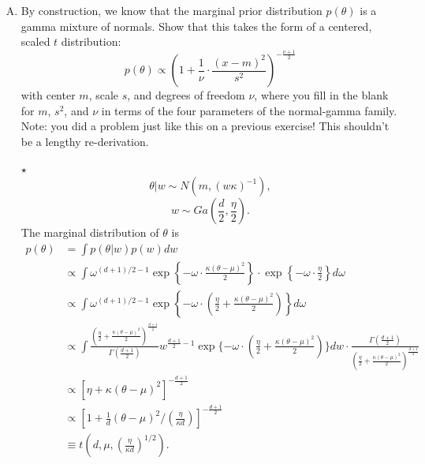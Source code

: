 \documentclass[11pt]{article}
\newcommand{\jie}{$\star$ }
\begin{document}
\begin{enumerate}[(A)]


\item By construction, we know that the marginal prior distribution $p(\theta)$ is a gamma mixture of normals.  Show that this takes the form of a centered, scaled $t$ distribution: 
$$
p(\theta) \propto \left(1+ \frac{1}{\nu} \cdot \frac{(x - m)^2}{s^2}  \right)^{-\frac{\nu+1}{2}}
$$
with center $m$,  scale $s$, and degrees of freedom $\nu$, where you fill in the blank for $m$, $s^2$, and $\nu$ in terms of the four parameters of the normal-gamma family.  Note: you did a problem just like this on a previous exercise!  This shouldn't be a lengthy re-derivation.

\bigskip
\jie
$$\theta|w \sim N(m,(w\kappa)^{-1}),$$
$$w \sim Ga(\frac{d}{2}, \frac{\eta}{2}).$$
The marginal distribution of $\theta$ is
\begin{align*}
    p(\theta) &= \int p(\theta|w) p(w) dw \\
    &\propto \int \omega^{(d+1)/{2} - 1} \exp \left\{ - \omega \cdot \frac{\kappa (\theta - \mu)^2}{2}  \right\} \cdot \exp\left\{ -  \omega \cdot \frac{\eta}{2}  \right\} d\omega\\
    &\propto \int \omega^{(d+1)/{2} - 1} \exp \left\{ - \omega \cdot (\frac{\eta}{2} + \frac{\kappa (\theta - \mu)^2}{2} ) \right\} d\omega \\
    &\propto \int \frac{(\frac{\eta}{2} + \frac{\kappa (\theta - \mu)^2}{2} )^{\frac{d+1}{2}} }{\Gamma(\frac{d+1}{2})} w^{\frac{d+1}{2} -1} \exp \{- \omega \cdot (\frac{\eta}{2} + \frac{\kappa (\theta - \mu)^2}{2} ) \} dw \cdot \frac{\Gamma(\frac{d+1}{2})}{(\frac{\eta}{2} + \frac{\kappa (\theta - \mu)^2}{2} )^{\frac{d+1}{2}} } \\
    &\propto [\eta+\kappa (\theta - \mu)^2]^{-\frac{d+1}{2}} \\
    &\propto [1+\frac{1}{d}(\theta-\mu)^2/(\frac{\eta}{\kappa d})]^{-\frac{d+1}{2}} \\
    &\equiv t(d,\mu,(\frac{\eta}{\kappa d})^{1/2}).
\end{align*}


\end{enumerate}
\end{document}
